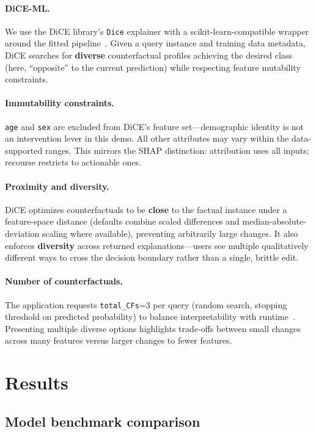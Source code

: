 \documentclass[11pt,a4paper]{article}
\begin{document}
\paragraph{DiCE-ML.}
We use the DiCE library's \texttt{Dice} explainer with a scikit-learn-compatible wrapper around the fitted pipeline~\cite{dice}. Given a query instance and training data metadata, DiCE searches for \textbf{diverse} counterfactual profiles achieving the desired class (here, ``opposite'' to the current prediction) while respecting feature mutability constraints.

\paragraph{Immutability constraints.}
\texttt{age} and \texttt{sex} are excluded from DiCE's feature set—demographic identity is not an intervention lever in this demo. All other attributes may vary within the data-supported ranges. This mirrors the SHAP distinction: attribution uses all inputs; recourse restricts to actionable ones.

\paragraph{Proximity and diversity.}
DiCE optimizes counterfactuals to be \textbf{close} to the factual instance under a feature-space distance (defaults combine scaled differences and median-absolute-deviation scaling where available), preventing arbitrarily large changes. It also enforces \textbf{diversity} across returned explanations—users see multiple qualitatively different ways to cross the decision boundary rather than a single, brittle edit.

\paragraph{Number of counterfactuals.}
The application requests \texttt{total\_CFs}=3 per query (random search, stopping threshold on predicted probability) to balance interpretability with runtime~\cite{dice,streamlit}. Presenting multiple diverse options highlights trade-offs between small changes across many features versus larger changes to fewer features.

\section{Results}
\label{sec:results}

\subsection{Model benchmark comparison}
\label{sec:bench}
\end{document}
